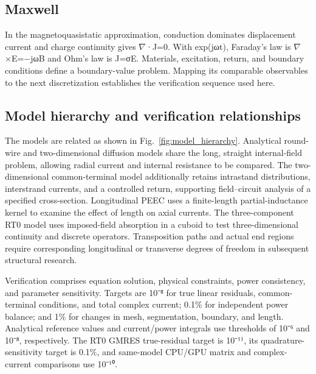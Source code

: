 \hypertarget{02.maxwell.heading}{}
\subsection{Maxwell}

\hypertarget{02.maxwell.p1}{}
In the magnetoquasistatic approximation, conduction dominates displacement current and charge continuity gives \(\nabla\)·J=0. With exp(jωt), Faraday’s law is \(\nabla\)×E=−jωB and Ohm’s law is J=σE. Materials, excitation, return, and boundary conditions define a boundary-value problem. Mapping its comparable observables to the next discretization establishes the verification sequence used here.

\hypertarget{02.hierarchy.heading}{}
\subsection{Model hierarchy and verification relationships}

\hypertarget{02.hierarchy.p1}{}
The models are related as shown in Fig.~\ref{fig:model_hierarchy}. Analytical round-wire and two-dimensional diffusion models share the long, straight internal-field problem, allowing radial current and internal resistance to be compared. The two-dimensional common-terminal model additionally retains intrastand distributions, interstrand currents, and a controlled return, supporting field–circuit analysis of a specified cross-section. Longitudinal PEEC uses a finite-length partial-inductance kernel to examine the effect of length on axial currents. The three-component RT0 model uses imposed-field absorption in a cuboid to test three-dimensional continuity and discrete operators. Transposition paths and actual end regions require corresponding longitudinal or transverse degrees of freedom in subsequent structural research.

\hypertarget{02.hierarchy.p2}{}
Verification comprises equation solution, physical constraints, power consistency, and parameter sensitivity. Targets are 10⁻⁸ for true linear residuals, common-terminal conditions, and total complex current; 0.1\% for independent power balance; and 1\% for changes in mesh, segmentation, boundary, and length. Analytical reference values and current/power integrals use thresholds of 10⁻⁶ and 10⁻⁸, respectively. The RT0 GMRES true-residual target is 10⁻¹¹, its quadrature-sensitivity target is 0.1\%, and same-model CPU/GPU matrix and complex-current comparisons use 10⁻¹⁰.

